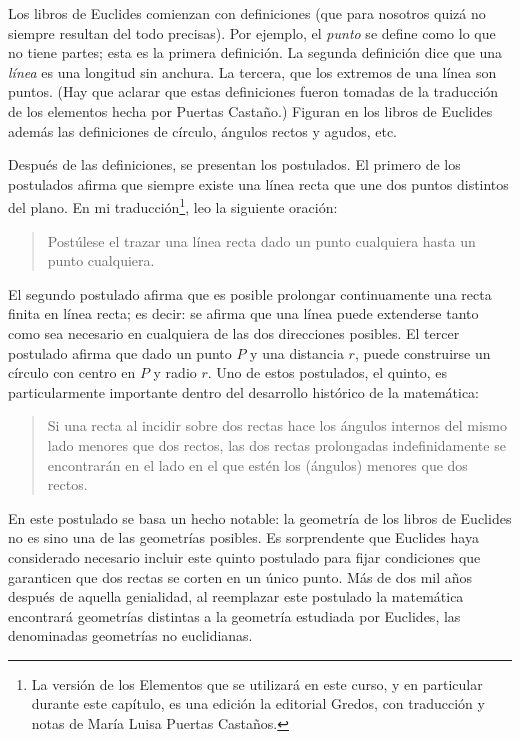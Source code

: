 Los libros de Euclides comienzan con definiciones (que para nosotros quizá no
siempre resultan del todo precisas). Por ejemplo, el \emph{punto} se define
como lo que no tiene partes; esta es la primera definición. La segunda
definición dice que una \emph{línea} es una longitud sin anchura. La tercera,
que los extremos de una línea son puntos. (Hay que aclarar que estas
definiciones fueron tomadas de la traducción de los elementos hecha por Puertas
Castaño.) Figuran en los libros de Euclides 
además las definiciones de círculo, ángulos rectos y agudos,
etc.

Después de las definiciones, se presentan los postulados. El primero de los
postulados afirma que siempre existe una línea recta que une dos puntos
distintos del plano. En mi traducción\footnote{La versión de los Elementos que
	se utilizará en este curso, y en particular durante este capítulo, es una
	edición la editorial Gredos, con traducción y notas de María
Luisa Puertas Castaños.}, leo la siguiente oración: 
\begin{quote}
	Postúlese el trazar una línea recta dado un punto cualquiera hasta un punto
	cualquiera. 
\end{quote}
El segundo postulado afirma que es posible prolongar continuamente una recta
finita en línea recta; es decir: se afirma que una línea puede extenderse tanto
como sea necesario en cualquiera de las dos direcciones posibles.  El tercer
postulado afirma que dado un punto $P$ y una distancia $r$, puede construirse
un círculo con centro en $P$ y radio $r$. Uno de estos postulados, el quinto,
es particularmente importante dentro del desarrollo histórico de la matemática: 

\begin{quote}
	Si una recta al incidir sobre dos rectas hace los ángulos internos del
	mismo lado menores que dos rectos, las dos rectas prolongadas
	indefinidamente se encontrarán en el lado en el que estén los (ángulos)
	menores que dos rectos.
\end{quote}

En este postulado se basa un hecho notable: la geometría de los libros de
Euclides no es sino una de las geometrías posibles. Es sorprendente que
Euclides haya considerado necesario incluir este quinto postulado para fijar
condiciones que garanticen que dos rectas se corten en un único punto.  Más de
dos mil años después de aquella genialidad, al reemplazar este postulado la
matemática encontrará geometrías distintas a la geometría estudiada por
Euclides, las denominadas geometrías no euclidianas.

